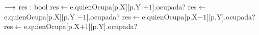 \begin{algorithm}[H]
\begin{algorithmic}[1]
 {$\longrightarrow$ res : bool} 
	\State res$\gets$e.quienOcupa[p.X][p.Y $+1$].ocupada? \Else {}
		\State res$\gets$e.quienOcupa[p.X][p.Y $-1$].ocupada? \Else {}
		 
			\State res$\gets$e.quienOcupa[p.X$-1$][p.Y].ocupada? \Else {}
			\State res$\gets$e.quienOcupa[p.X$+1$][p.Y].ocupada? 
		\EndIf
	\EndIf
\EndIf
\EndFunction
\end{algorithmic}
\end{algorithm}
